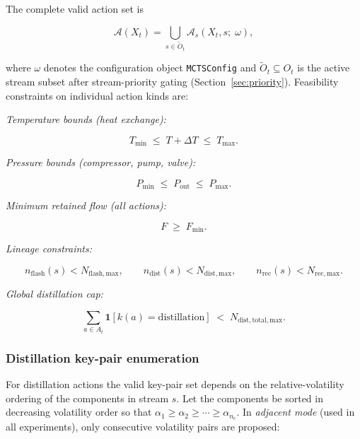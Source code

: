 \documentclass[11pt,a4paper]{article}
\theoremstyle{definition}
\theoremstyle{plain}
\newcommand{\MCTSConfig}{\texttt{MCTSConfig}}
\newcommand{\calA}{\mathcal{A}}
\begin{document}
The complete valid action set is

\begin{equation}
 \calA(X_t)
 = \bigcup_{s \in \tilde{O}_t}
  \calA_s(X_t, s;\; \omega),
\end{equation}

where $\omega$ denotes the configuration object \MCTSConfig{} and $\tilde{O}_t \subseteq O_t$ is the active stream subset after stream-priority gating (Section~\ref{sec:priority}). Feasibility constraints on individual action kinds are:

\medskip
\noindent\textit{Temperature bounds (heat exchange):}

\begin{equation}
 T_{\min} \;\leq\; T + \Delta T \;\leq\; T_{\max}.
\end{equation}

\noindent\textit{Pressure bounds (compressor, pump, valve):}

\begin{equation}
 P_{\min} \;\leq\; P_{\mathrm{out}} \;\leq\; P_{\max}.
\end{equation}

\noindent\textit{Minimum retained flow (all actions):}

\begin{equation}
 F \;\geq\; F_{\min}.
\end{equation}

\noindent\textit{Lineage constraints:}

\begin{equation}
 n_{\mathrm{flash}}(s) < N_{\mathrm{flash,max}},
 \qquad
 n_{\mathrm{dist}}(s) < N_{\mathrm{dist,max}},
 \qquad
 n_{\mathrm{rec}}(s) < N_{\mathrm{rec,max}}.
\end{equation}

\noindent\textit{Global distillation cap:}

\begin{equation}
 \sum_{a \in A_t} \mathbf{1}[k(a) = \mathrm{distillation}]
 \;<\; N_{\mathrm{dist,total,max}}.
\end{equation}

\subsubsection{Distillation key-pair enumeration}

For distillation actions the valid key-pair set depends on the relative-volatility ordering of the components in stream $s$. Let the components be sorted in decreasing volatility order so that $\alpha_1 \geq \alpha_2 \geq \cdots \geq \alpha_{n_c}$. In \emph{adjacent mode} (used in all experiments), only consecutive volatility pairs are proposed:
\end{document}
